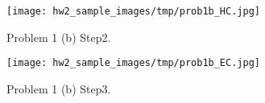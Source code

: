 \begin{figure}
    \centering
    \texttt{[image: hw2\_sample\_images/tmp/prob1b\_HC.jpg]}
    \caption{Problem 1 (b) Step2.}
    \label{prob1b_HC}
\end{figure}

\begin{figure}
    \centering
    \texttt{[image: hw2\_sample\_images/tmp/prob1b\_EC.jpg]}
    \caption{Problem 1 (b) Step3.}
    \label{prob1b_EC}
\end{figure}
